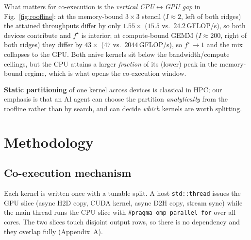 \documentclass[conference]{IEEEtran}
\begin{document}
What matters for co-execution is the \emph{vertical CPU$\leftrightarrow$GPU gap} in
Fig.~\ref{fig:roofline}: at the memory-bound $3{\times}3$ stencil ($I{\approx}2$, left of
both ridges) the attained throughputs differ by only $1.55\times$ ($15.5$ vs.\
$24.2$\,GFLOP/s), so both devices contribute and $f^\star$ is interior; at compute-bound
GEMM ($I{\approx}200$, right of both ridges) they differ by $43\times$ ($47$ vs.\
$2044$\,GFLOP/s), so $f^\star\!\to\!1$ and the mix collapses to the GPU. Both naive kernels
sit below the bandwidth/compute ceilings, but the CPU attains a larger \emph{fraction} of
its (lower) peak in the memory-bound regime, which is what opens the co-execution window.

\textbf{Static partitioning} of one kernel across devices is classical in HPC; our
emphasis is that an AI agent can choose the partition \emph{analytically} from the
roofline rather than by search, and can decide \emph{which} kernels are worth splitting.

\section{Methodology}

\subsection{Co-execution mechanism}
Each kernel is written once with a tunable split. A host \texttt{std::thread} issues the
GPU slice (async H2D copy, CUDA kernel, async D2H copy, stream sync) while the main
thread runs the CPU slice with \texttt{\#pragma omp parallel for} over all cores. The two
slices touch disjoint output rows, so there is no dependency and they overlap fully
(Appendix~A).
\end{document}
